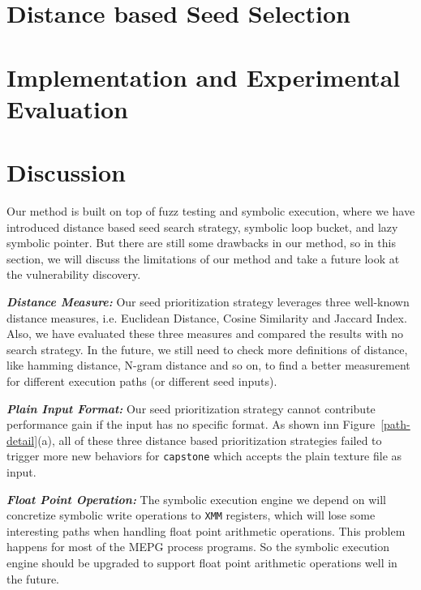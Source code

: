 \documentclass[a4paper]{article}
\begin{document}


\section{Distance based Seed Selection} \label{sec:seed selection}


\section{Implementation and Experimental Evaluation} \label{sec:evaluate}




\section{Discussion} \label{sec:discussion}
Our method is built on top of fuzz testing and symbolic execution, where we have introduced distance based seed search strategy, symbolic loop bucket, and lazy symbolic pointer. But there are still some drawbacks in our method, so in this section, we will discuss the limitations of our method and take a future look at the vulnerability discovery.

\noindent\textit{\textbf{Distance Measure:}} Our seed prioritization strategy leverages three well-known distance measures, i.e. Euclidean Distance, Cosine Similarity and Jaccard Index. Also, we have evaluated these three measures and compared the results with no search strategy. In the future, we still need to check more definitions of distance, like hamming distance, N-gram distance and so on, to find a better measurement for different execution paths (or different seed inputs). 

\noindent\textit{\textbf{Plain Input Format:}} Our seed prioritization strategy cannot contribute performance gain if the input has no specific format. As shown inn Figure~\ref{path-detail}(a), all of these three distance based prioritization strategies failed to trigger more new behaviors for \texttt{capstone} which accepts the plain texture file as input. 

\noindent\textit{\textbf{Float Point Operation:}} The symbolic execution engine we depend on will concretize symbolic write operations to \texttt{XMM} registers, which will lose some interesting paths when handling float point arithmetic operations. This problem happens for most of the MEPG process programs. So the symbolic execution engine should be upgraded to support float point arithmetic operations well in the future.
\end{document}
